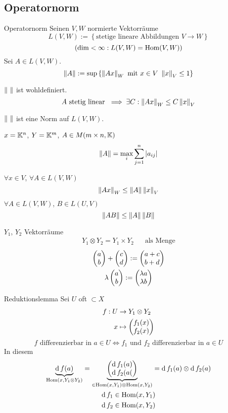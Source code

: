 \subsection{Operatornorm}
\begin{Def}{Operatornorm}
  Seinen $V,W$ normierte Vektorräume
  \[L(V,W):=\left\{ \text{stetige lineare Abbildungen $V\to W$} \right\}\]
  \[\left( \dim < \infty:L(V,W)=\operatorname{Hom}(V,W) \right)\]
  Sei $A\in L(V,W)$.
  \[\Norm{A}:=\sup\left\{ \Norm{Ax}_W \ \text{mit}\ x\in V\ \Norm{x}_V\leq 1 \right\}\]
\end{Def}
\begin{Bem}
  $\left\| \  \right\|$ ist wohldefiniert.
  \[A\ \text{stetig linear}\ \implies\exists C:\left\| Ax \right\|_W\leq C\left\| x \right\|_V\]
\end{Bem}
\begin{Lem}
  $\left\| \  \right\|$ ist eine Norm auf $L(V,W)$.
\end{Lem}
\begin{Bem}
  $x=\mathbb{K}^n$, $Y=\mathbb{K}^m$, $A\in M(m\times n, \mathbb{K})$
  \[\left\| A \right\|=\max_i\sum_{j=1}^n\left| a_{ij} \right|\]
\end{Bem}
\begin{Sat}
  $\forall x\in V$, $\forall A\in L(V,W)$
  \[\left\| Ax \right\|_W\leq\left\| A \right\|\left\| x \right\|_V\]
  $\forall A\in L(V,W)$, $B\in L(U,V)$
  \[\left\| AB \right\|\leq \left\| A \right\|\left\| B \right\|\]
\end{Sat}
\begin{Not}
  $Y_1$, $Y_2$ Vektorräume
  \begin{align*}
    Y_1\otimes Y_2=Y_1\times Y_2&&\text{als Menge}
  \end{align*}
  \begin{gather*}
    \begin{pmatrix}a\\b\end{pmatrix}+\begin{pmatrix}c\\d\end{pmatrix}:=\begin{pmatrix}a+c\\b+d\end{pmatrix}\\
    \lambda\begin{pmatrix}a\\b\end{pmatrix}:=\begin{pmatrix}\lambda a\\ \lambda b\end{pmatrix}
  \end{gather*}
\end{Not}
\begin{Lem}{Reduktionslemma}
  Sei $U$ oft $\subset X$
  \begin{align*}
    f:U&\to Y_1\otimes Y_2\\
    x&\mapsto \begin{pmatrix}f_1(x)\\f_2(x)\end{pmatrix}
  \end{align*}
  \[\text{$f$ differenzierbar in $a\in U$}\iff\text{$f_1$ und $f_2$ differenzierbar in $a\in U$}\]
  In diesem
  \begin{gather*}
    \underbrace{\operatorname{d} f(a)}_{\operatorname{Hom}\left( x,Y_1\otimes Y_2 \right)}=\underbrace{\begin{pmatrix}\operatorname{d} f_1(a)\\\operatorname{d} f_2(a(\end{pmatrix}}_{\in \operatorname{Hom}\left( x,Y_1 \right)\otimes \operatorname{Hom} (x,Y_2)} =\operatorname{d} f_1(a)\otimes \operatorname{d} f_2(a)\\
    \operatorname{d} f_1\in\operatorname{Hom}(x,Y_1)\\
    \operatorname{d} f_2\in \operatorname{Hom}(x,Y_2)
  \end{gather*}
\end{Lem}
